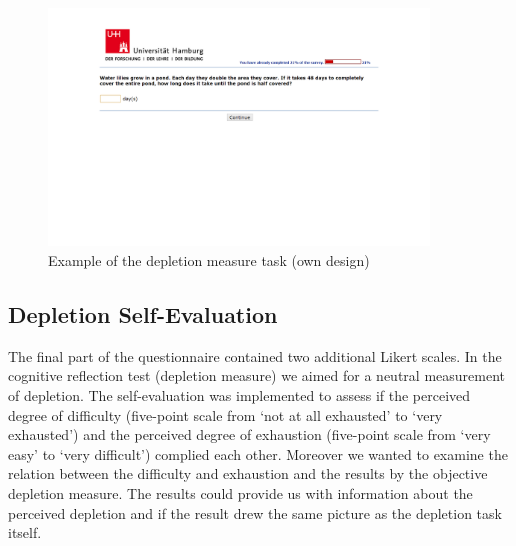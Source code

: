 \begin{figure}[h!]
\center
	\includegraphics[trim = 8cm 18cm 8cm 2cm,clip=true,width=0.9\textwidth]{images/os_depletion_measure.png}
  \caption{Example of the depletion measure task (own design)}\label{fig:os_depletion_measure}
\end{figure}

\subsection{Depletion Self-Evaluation}\label{sec:depletion_self_evaluation}
The final part of the questionnaire contained two additional Likert scales. In the cognitive reflection test (depletion measure) we aimed for a neutral measurement of depletion. The self-evaluation was implemented to assess if the perceived degree of difficulty (five-point scale from ‘not at all exhausted’ to ‘very exhausted’) and the perceived degree of exhaustion (five-point scale from ‘very easy’ to ‘very difficult’) complied each other. Moreover we wanted to examine the relation between the difficulty and exhaustion and the results by the objective depletion measure. The results could provide us with information about the perceived depletion and if the result drew the same picture as the depletion task itself. 


